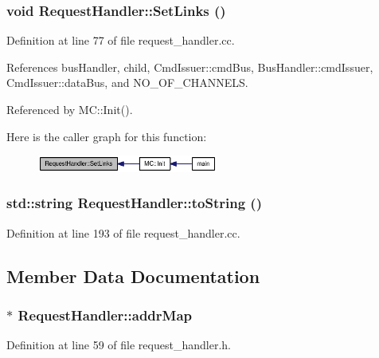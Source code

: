 \subsubsection[{SetLinks}]{\setlength{\rightskip}{0pt plus 5cm}void RequestHandler::SetLinks ()}\label{classRequestHandler_9496685187c3ae6632525b7213fe85c6}




Definition at line 77 of file request\_\-handler.cc.

References busHandler, child, CmdIssuer::cmdBus, BusHandler::cmdIssuer, CmdIssuer::dataBus, and NO\_\-OF\_\-CHANNELS.

Referenced by MC::Init().

Here is the caller graph for this function:\nopagebreak
\begin{figure}[H]
\begin{center}
\leavevmode
\includegraphics[width=168pt]{classRequestHandler_9496685187c3ae6632525b7213fe85c6_icgraph}
\end{center}
\end{figure}
\subsubsection[{toString}]{\setlength{\rightskip}{0pt plus 5cm}std::string RequestHandler::toString ()}\label{classRequestHandler_e4ec28c4cc1247cae927f9fc2a43dad7}




Definition at line 193 of file request\_\-handler.cc.

\subsection{Member Data Documentation}
\subsubsection[{addrMap}]{$\ast$ {\bf RequestHandler::addrMap}}\label{classRequestHandler_7a16df768f3c6ad8aba05a35e1ae9a46}




Definition at line 59 of file request\_\-handler.h.

